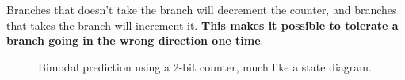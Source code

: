 Branches that doesn't take the branch will decrement the counter, and branches that takes the branch will increment it.
\textbf{This makes it possible to tolerate a branch going in the wrong direction one time}.

\begin{figure}[H]
	\centering
	\caption{Bimodal prediction using a 2-bit counter, much like a state diagram.}
	\label{fig:bimodal-prediction}
\end{figure}
